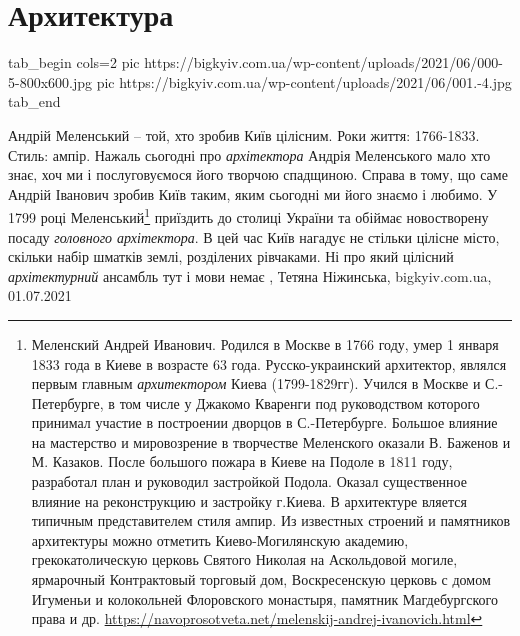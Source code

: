  
 
 
 
 
\chapter{Архитектура}
\label{sec:slova.arhitektura}


\ifcmt
  tab_begin cols=2
     pic https://bigkyiv.com.ua/wp-content/uploads/2021/06/000-5-800x600.jpg
     pic https://bigkyiv.com.ua/wp-content/uploads/2021/06/001.-4.jpg
  tab_end
\fi

Андрій Меленський – той, хто зробив Київ цілісним.  Роки життя: 1766-1833.
Стиль: ампір.
Нажаль сьогодні про \emph{архітектора} Андрія Меленського мало хто знає, хоч ми і
послуговуємося його творчою спадщиною. Справа в тому, що саме Андрій Іванович
зробив Київ таким, яким сьогодні ми його знаємо і любимо.
У 1799 році Меленський\footnote{
Меленский Андрей Иванович. Родился в Москве в 1766 году, умер 1 января 1833
года в Киеве в возрасте 63 года. Русско-украинский архитектор, являлся первым
главным \emph{архитектором} Киева (1799-1829гг).  Учился в Москве и С.-Петербурге, в
том числе у Джакомо Кваренги под руководством которого принимал участие в
построении дворцов в С.-Петербурге. Большое влияние на мастерство и
мировозрение в творчестве Меленского оказали В. Баженов и М. Казаков. После
большого пожара в Киеве на Подоле в 1811 году, разработал план и руководил
застройкой Подола. Оказал существенное влияние на реконструкцию и застройку
г.Киева.  В архитектуре вляется типичным представителем стиля ампир. Из
известных строений и памятников архитектуры можно отметить Киево-Могилянскую
академию, грекокатолическую церковь Святого Николая на Аскольдовой могиле,
ярмарочный Контрактовый торговый дом, Воскресенскую церковь с домом Игуменьи и
колокольней Флоровского монастыря, памятник Магдебургского права и др.
\url{https://navoprosotveta.net/melenskij-andrej-ivanovich.html}
} приїздить до столиці України та обіймає новостворену
посаду \emph{головного архітектора}. В цей час Київ нагадує не стільки цілісне місто,
скільки набір шматків землі, розділених рівчаками. Ні про який цілісний
\emph{архітектурний} ансамбль тут і мови немає
, 
Тетяна Ніжинська, bigkyiv.com.ua, 01.07.2021

